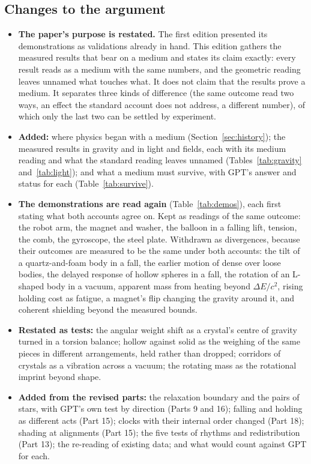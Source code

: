 \documentclass[11pt,a4paper]{article}
\begin{document}
\subsection*{Changes to the argument}
\begin{itemize}
\item \textbf{The paper's purpose is restated.} The first edition presented its demonstrations as validations already in hand. This edition gathers the measured results that bear on a medium and states its claim exactly: every result reads as a medium with the same numbers, and the geometric reading leaves unnamed what touches what. It does not claim that the results prove a medium. It separates three kinds of difference (the same outcome read two ways, an effect the standard account does not address, a different number), of which only the last two can be settled by experiment.
\item \textbf{Added:} where physics began with a medium (Section~\ref{sec:history}); the measured results in gravity and in light and fields, each with its medium reading and what the standard reading leaves unnamed (Tables~\ref{tab:gravity} and~\ref{tab:light}); and what a medium must survive, with GPT's answer and status for each (Table~\ref{tab:survive}).
\item \textbf{The demonstrations are read again} (Table~\ref{tab:demos}), each first stating what both accounts agree on. Kept as readings of the same outcome: the robot arm, the magnet and washer, the balloon in a falling lift, tension, the comb, the gyroscope, the steel plate. Withdrawn as divergences, because their outcomes are measured to be the same under both accounts: the tilt of a quartz-and-foam body in a fall, the earlier motion of dense over loose bodies, the delayed response of hollow spheres in a fall, the rotation of an L-shaped body in a vacuum, apparent mass from heating beyond $\Delta E/c^2$, rising holding cost as fatigue, a magnet's flip changing the gravity around it, and coherent shielding beyond the measured bounds.
\item \textbf{Restated as tests:} the angular weight shift as a crystal's centre of gravity turned in a torsion balance; hollow against solid as the weighing of the same pieces in different arrangements, held rather than dropped; corridors of crystals as a vibration across a vacuum; the rotating mass as the rotational imprint beyond shape.
\item \textbf{Added from the revised parts:} the relaxation boundary and the pairs of stars, with GPT's own test by direction (Parts 9 and 16); falling and holding as different acts (Part 15); clocks with their internal order changed (Part 18); shading at alignments (Part 15); the five tests of rhythms and redistribution (Part 13); the re-reading of existing data; and what would count against GPT for each.
\end{itemize}
\end{document}
